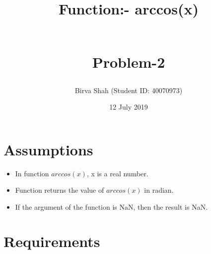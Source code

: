 \documentclass{article}
\title{Function:- arccos(x)
\begin{large}
\\
\Large Problem-2
\end{large}
}
\author{Birva Shah (Student ID: 40070973) }
\date{12 July 2019}
\begin{document}
\maketitle
\section{Assumptions}
\begin{itemize}
    \item In function $arccos(x)$, x is a real number.
    \item Function returns the value of $arccos(x)$ in radian. 
    \item If the argument of the function is NaN, then the result is NaN.
\end{itemize}  
\section{Requirements}
\end{document}
